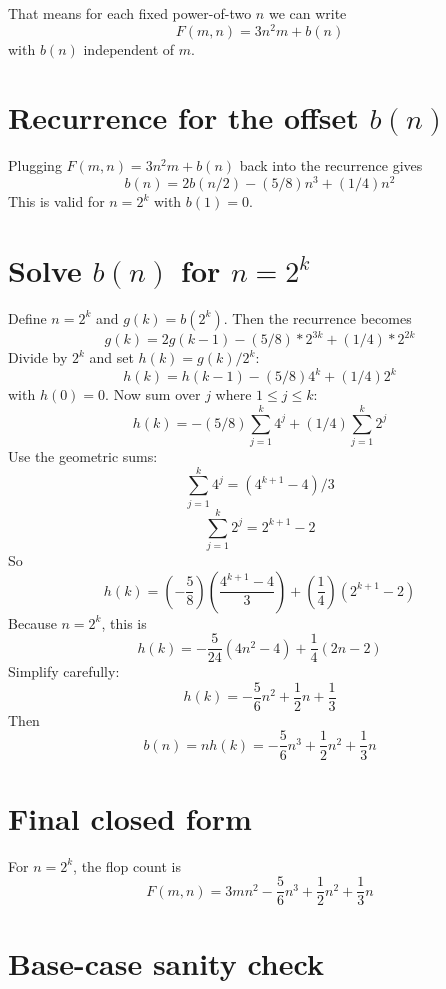 \documentclass[10pt]{article}
\begin{document}
That means for each fixed power-of-two $n$ we can write
\[F(m,n) = 3 n^2 m + b(n)\]
with $b(n)$ independent of $m$.


\section{Recurrence for the offset $b(n)$}

Plugging $F(m,n)=3 n^2 m + b(n)$ back into the recurrence gives
\[b(n) = 2 b(n/2) - (5/8) n^3 + (1/4) n^2\]
This is valid for $n = 2^k$ with $b(1)=0$.


\section{Solve $b(n)$ for $n = 2^k$}

Define $n = 2^k$ and $g(k) = b(2^k)$.
Then the recurrence becomes
\[g(k) = 2 g(k-1) - (5/8) * 2^{3k} + (1/4) * 2^{2k}\]
Divide by $2^k$ and set $h(k) = g(k)/2^k$:
\[h(k) = h(k-1) - (5/8) 4^k + (1/4) 2^k\]
with $h(0)=0$.
Now sum over $j$ where $1\leq j \leq k$:
\[h(k) = - (5/8) \sum_{j=1}^k 4^j + (1/4) \sum_{j=1}^k 2^j\]
Use the geometric sums:
\[ \sum_{j=1}^k 4^j = (4^{k+1}-4)/3\]
\[ \sum_{j=1}^k 2^j = 2^{k+1}-2\]
So
\[h(k) = \left(-\frac{5}{8}\right) \left(\frac{4^{k+1}-4}{3}\right) +
\left(\frac{1}{4}\right)\left(2^{k+1}-2\right)\]
Because $n=2^k$, this is
\[h(k) = -\frac{5}{24}(4 n^2 - 4) + \frac{1}{4}(2n - 2)\]
Simplify carefully:
\[h(k) = -\frac{5}{6} n^2 + \frac{1}{2} n + \frac{1}{3}\]
Then
\[b(n) = n h(k) = -\frac{5}{6} n^3 + \frac{1}{2} n^2 + \frac{1}{3} n\]


\section{Final closed form}

For $n = 2^k$, the flop count is
\[F(m,n) = 3 m n^2 - \frac{5}{6} n^3 + \frac{1}{2} n^2 + \frac{1}{3} n\]


\section{Base-case sanity check}
\end{document}
